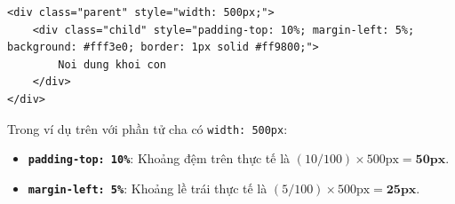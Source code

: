 \documentclass[11pt,oneside]{book}
\newcommand{\codeinline}[1]{\textcolor{accentOrange}{\texttt{#1}}}
\begin{document}
\begin{codeWindow}
\begin{lstlisting}[language=HTML5]
<div class="parent" style="width: 500px;">
    <div class="child" style="padding-top: 10%; margin-left: 5%; background: #fff3e0; border: 1px solid #ff9800;">
        Noi dung khoi con
    </div>
</div>
\end{lstlisting}
\end{codeWindow}

\begin{conceptBox}
Trong ví dụ trên với phần tử cha có \codeinline{width: 500px}:
\begin{itemize}[leftmargin=1.5em, itemsep=2pt, parsep=0pt]
    \item \textbf{\codeinline{padding-top: 10\%}}: Khoảng đệm trên thực tế là $(10 / 100) \times 500\text{px} = \mathbf{50\text{px}}$.
    \item \textbf{\codeinline{margin-left: 5\%}}: Khoảng lề trái thực tế là $(5 / 100) \times 500\text{px} = \mathbf{25\text{px}}$.
\end{itemize}
\end{conceptBox}
\end{document}
